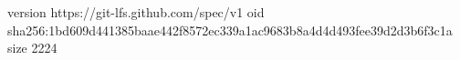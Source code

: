 version https://git-lfs.github.com/spec/v1
oid sha256:1bd609d441385baae442f8572ec339a1ac9683b8a4d4d493fee39d2d3b6f3c1a
size 2224
